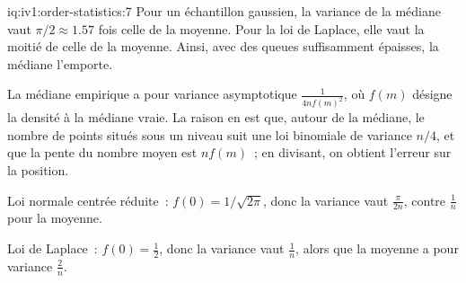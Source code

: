 \begin{solution}{iq:iv1:order-statistics:7}
Pour un échantillon gaussien, la variance de la médiane vaut $\pi/2 \approx 1.57$ fois celle de la moyenne. Pour la loi de Laplace, elle vaut la moitié de celle de la moyenne. Ainsi, avec des queues suffisamment épaisses, la médiane l'emporte.

La médiane empirique a pour variance asymptotique $\frac{1}{4 n f(m)^2}$, où $f(m)$ désigne la densité à la médiane vraie. La raison en est que, autour de la médiane, le nombre de points situés sous un niveau suit une loi binomiale de variance $n/4$, et que la pente du nombre moyen est $n f(m)$~; en divisant, on obtient l'erreur sur la position.

Loi normale centrée réduite~: $f(0) = 1/\sqrt{2\pi}$, donc la variance vaut $\frac{\pi}{2n}$, contre $\frac1n$ pour la moyenne.

Loi de Laplace~: $f(0) = \tfrac12$, donc la variance vaut $\frac1n$, alors que la moyenne a pour variance $\frac2n$.

\end{solution}


